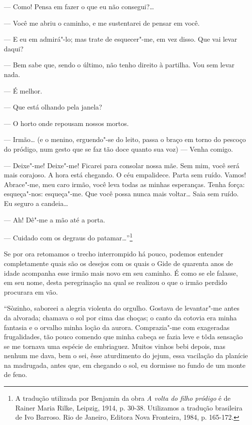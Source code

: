 --- Como! Pensa em fazer o que eu não consegui?\ldots{}

--- Você me abriu o caminho, e me sustentarei de pensar em você.

--- E eu em admirá"-lo; mas trate de esquecer"-me, em vez disso. Que vai
levar daqui?

--- Bem sabe que, sendo o último, não tenho direito à partilha. Vou sem
levar nada.

--- É melhor.

--- Que está olhando pela janela?

--- O horto onde repousam nossos mortos.

--- Irmão\ldots{} (e o menino, erguendo"-se do leito, passa o braço em torno do
pescoço do pródigo, num gesto que se faz tão doce quanto sua voz) ---
Venha comigo.

--- Deixe"-me! Deixe"-me! Ficarei para consolar nossa mãe. Sem mim, você
será mais corajoso. A hora está chegando. O céu empalidece. Parta sem
ruído. Vamos! Abrace"-me, meu caro irmão, você leva todas as minhas
esperanças. Tenha força: esqueça"-nos: esqueça"-me. Que você possa nunca
mais voltar\ldots{} Saia sem ruído. Eu seguro a candeia\ldots{}

--- Ah! Dê"-me a mão até a porta.

--- Cuidado com os degraus do patamar\ldots{}''\footnote{A tradução
  utilizada por Benjamin da obra \emph{A volta do filho pródigo} é de
  Rainer Maria Rilke, Leipzig, 1914, p. 30-38. Utilizamos a tradução
  brasileira de Ivo Barroso. Rio de Janeiro, Editora Nova Fronteira,
  1984, p. 165-172. \versal{[N. T.]}}

Se por ora retomamos o trecho interrompido há pouco, podemos entender
completamente quais são os desejos com os quais o Gide de quarenta anos
de idade acompanha esse irmão mais novo em seu caminho. É como se ele
falasse, em seu nome, desta peregrinação na qual se realizou o que o
irmão perdido procurara em vão.

``Sòzinho, saboreei a alegria violenta do orgulho. Gostava de
levantar"-me antes da alvorada; chamava o sol por cima das choças; o
canto da cotovia era minha fantasia e o orvalho minha loção da aurora.
Comprazia"-me com exageradas frugalidades, tão pouco comendo que minha
cabeça se fazia leve e tôda sensação se me tornava uma espécie de
embriaguez. Muitos vinhos bebi depois, mas nenhum me dava, bem o sei,
êsse aturdimento do jejum, essa vacilação da planície na madrugada,
antes que, em chegando o sol, eu dormisse no fundo de um monte de feno.

